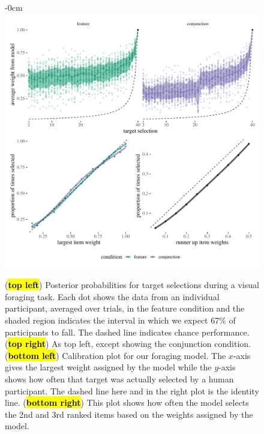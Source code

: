 \documentclass[vision,article,accept,pdftex,moreauthors]{Definitions/mdpi}
\begin{document}
\begin{figure}[H]
\begin{adjustwidth}{-\extralength}{0cm}
\centering
\includegraphics[width=17.8 cm]{Figures/qjep_preds.pdf}
\end{adjustwidth}
\caption{({\textbf{\hl{top left}}}) Posterior probabilities for target selections during a visual foraging task. Each dot shows the data from an individual participant, averaged over trials, in the feature condition and the shaded region indicates the interval in which we expect 67\% of participants to fall. The dashed line indicates chance performance. (\textbf{\hl{top right}}) As top left, except showing the conjunction condition. (\textbf{\hl{bottom left}})  Calibration plot for our foraging model. The $x$-axis gives the largest weight assigned by the model while the $y$-axis shows how often that target was actually selected by a human participant. The dashed line here and in the right plot is the identity line. (\textbf{\hl{bottom right}}) This plot shows how often the model selects the 2nd and 3rd ranked items based on the weights assigned by the model.} %




\end{figure}
\end{document}
